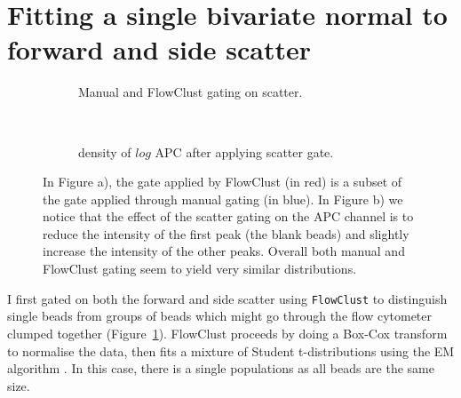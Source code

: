 

\section{Fitting a single bivariate normal to forward and side scatter}


\begin{figure}[ht]
    \begin{subfigure}[b]{.5\textwidth}
        \centering
        \caption{Manual and FlowClust gating on scatter.}
    \end{subfigure}
    ~
    \begin{subfigure}[b]{.5\textwidth}
        \centering
        \caption{density of $log$ APC after applying scatter gate.}
    \end{subfigure}
\caption{ \label{figure:bead-gate}
  In Figure a), the gate applied by FlowClust (in red) is a subset of the gate applied through manual gating (in blue).
In Figure b) we notice that the effect of the scatter gating on the APC channel is to reduce the intensity of the first peak (the blank beads) and slightly increase the intensity of the other peaks.
Overall both manual and FlowClust gating seem to yield very similar distributions. }
\end{figure}



I first gated on both the forward and side scatter using \texttt{FlowClust} \citep{Lo:2008it}
to distinguish single beads from groups of beads which might go through the flow cytometer clumped together (Figure~\ref{figure:bead-gate}).
FlowClust proceeds by doing a Box-Cox transform to normalise the data, then fits a mixture of Student t-distributions
using the EM algorithm \citep{Dempster:1977ul}. In this case, there is a single populations as all beads are the same size.


